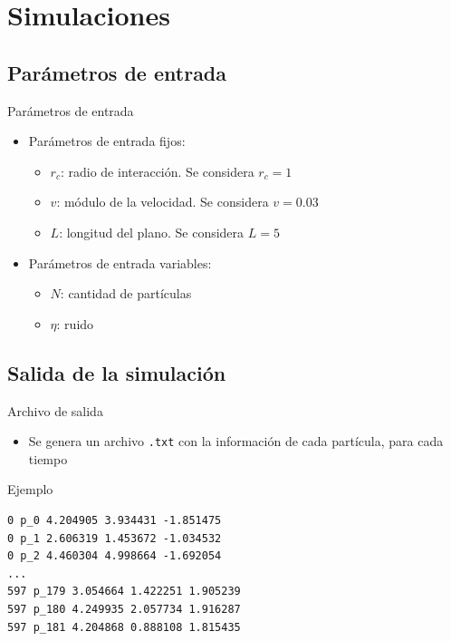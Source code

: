 \documentclass{beamer}
\begin{document}
    \section{Simulaciones}

        \subsection{Parámetros de entrada}

            \begin{frame}{Parámetros de entrada}
                \begin{itemize}
                    \item Parámetros de entrada fijos:
                    \begin{itemize}
                        \item $r_c$: radio de interacción. \alert{Se considera $r_c=1$}
                        \item $v$: módulo de la velocidad. \alert{Se considera $v=0.03$}
                        \item $L$: longitud del plano. \alert{Se considera $L=5$}
                    \end{itemize}
                    \item Parámetros de entrada variables:
                    \begin{itemize}
                        \item $N$: cantidad de partículas
                        \item $\eta$: ruido
                    \end{itemize}
                \end{itemize}
            \end{frame}

        \subsection{Salida de la simulación}

            \begin{frame}[fragile]{Archivo de salida}
                \begin{itemize}
                    \item Se genera un archivo \texttt{.txt} con la información de cada partícula, para cada tiempo
                \end{itemize}
                \begin{exampleblock}{Ejemplo}
                    \begin{verbatim}
0 p_0 4.204905 3.934431 -1.851475
0 p_1 2.606319 1.453672 -1.034532
0 p_2 4.460304 4.998664 -1.692054
...
597 p_179 3.054664 1.422251 1.905239
597 p_180 4.249935 2.057734 1.916287
597 p_181 4.204868 0.888108 1.815435
                    \end{verbatim}
                \end{exampleblock}
            \end{frame}
\end{document}
